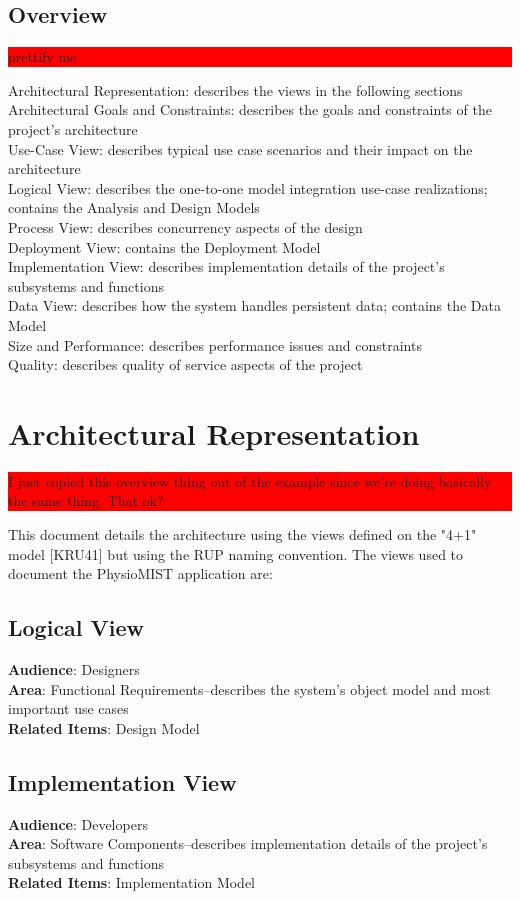 \documentclass{article}
\newcommand{\todo}[1]{\colorbox{red}{\begin{minipage}{\textwidth}{#1}\end{minipage}}}
\begin{document}
\subsection{Overview}
\todo{prettify me}
Architectural Representation: describes the views in the following sections\\
Architectural Goals and Constraints: describes the goals and constraints of the project's architecture\\
Use-Case View: describes typical use case scenarios and their impact on the architecture\\
Logical View: describes the one-to-one model integration use-case realizations; contains the Analysis and Design Models\\
Process View: describes concurrency aspects of the design\\
Deployment View: contains the Deployment Model\\
Implementation View: describes implementation details of the project's subsystems and functions\\
Data View: describes how the system handles persistent data; contains the Data Model\\
Size and Performance: describes performance issues and constraints\\
Quality: describes quality of service aspects of the project

\section{Architectural Representation}
\todo{I just copied this overview thing out of the example since we're doing basically the same thing. That ok?}
This document details the architecture using the views defined on the "4+1" model [KRU41] but using the RUP naming convention.
The views used to document the PhysioMIST application are:
\subsection{Logical View}
\textbf{Audience}: Designers\\
\textbf{Area}: Functional Requirements--describes the system's object model and most important use cases\\
\textbf{Related Items}: Design Model
\subsection{Implementation View}
\textbf{Audience}: Developers\\
\textbf{Area}: Software Components--describes implementation details of the project's subsystems and functions\\
\textbf{Related Items}: Implementation Model
\end{document}
